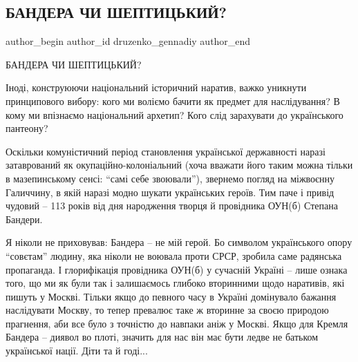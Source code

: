  
 
 
 
 
 
\subsection{БАНДЕРА ЧИ ШЕПТИЦЬКИЙ?}
\label{sec:01_01_2022.fb.druzenko_gennadiy.1.bandera_chy_sheptyckij}
 
\ifcmt
 author_begin
   author_id druzenko_gennadiy
 author_end
\fi

БАНДЕРА ЧИ ШЕПТИЦЬКИЙ?

Іноді, конструюючи національний історичний наратив, важко уникнути принципового
вибору: кого ми воліємо бачити як предмет для наслідування? В кому ми впізнаємо
національний архетип? Кого слід зарахувати до українського пантеону?


Оскільки комуністичний період становлення української державності наразі
затаврований як окупаційно-колоніальний (хоча вважати його таким можна тільки в
мазепинському сенсі: \enquote{самі себе звоювали}), звернемо погляд на міжвоєнну
Галиччину, в якій наразі модно шукати українських героїв. Тим паче і привід
чудовий – 113 років від дня народження творця й провідника ОУН(б) Степана
Бандери.

Я ніколи не приховував: Бандера – не мій герой. Бо символом українського опору
\enquote{совєтам} людину, яка ніколи не воювала проти СРСР, зробила саме радянська
пропаганда. І глорифікація провідника ОУН(б) у сучасній Україні – лише ознака
того, що ми як були так і залишаємось глибоко вторинними щодо наративів, які
пишуть у Москві. Тільки якщо до певного часу в Україні домінувало бажання
наслідувати Москву, то тепер превалює таке ж вторинне за своєю природою
прагнення, аби все було з точністю до навпаки аніж у Москві. Якщо для Кремля
Бандера – диявол во плоті, значить для нас він має бути ледве не батьком
української нації. Діти та й годі...

